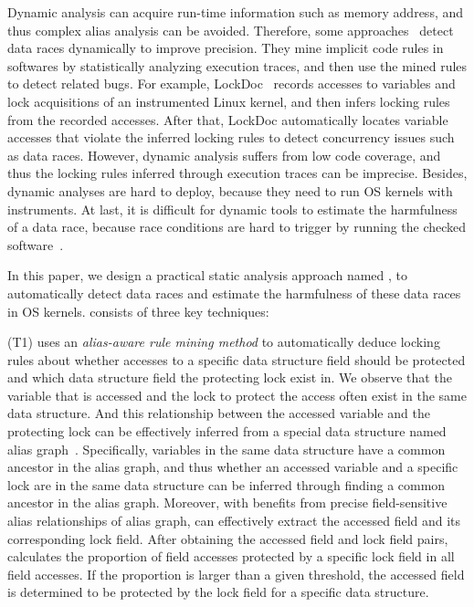 Dynamic analysis can acquire run-time information such as memory address, and 
thus complex alias analysis can be avoided. Therefore, some 
approaches~\cite{Lochmann:EuroSys19, Lu:SOSP07, Lu:FSE18, Joshi:ASE08, 
Liu:NSDI07} detect data races dynamically to improve precision. They mine 
implicit code rules in softwares by statistically analyzing execution traces, 
and then use the mined rules to detect related bugs. For example, 
LockDoc~\cite{Lochmann:EuroSys19} records accesses to variables and lock 
acquisitions of an instrumented Linux kernel, and then infers locking rules 
from the recorded accesses. After that, LockDoc automatically locates variable 
accesses that violate the inferred locking rules to detect concurrency issues 
such as data races. However, dynamic analysis suffers from low code coverage, 
and thus the locking rules inferred through execution traces can be imprecise. 
Besides, dynamic analyses are hard to deploy, because they need to run OS 
kernels with instruments. At last, it is difficult for dynamic tools to 
estimate the harmfulness of a data race, because race conditions are hard to 
trigger by running the checked software~\cite{Fonseca:DSN10, 
Burckhardt:ASPLOS10, Liu:FSE14, Zhou:EASE15}.

In this paper, we design a practical static analysis approach named \sys, 
to automatically detect data races and estimate the harmfulness of these data 
races in OS kernels. \sys consists of three key techniques:

(T1) \sys uses an {\em alias-aware rule mining method} to automatically deduce 
locking rules about whether accesses to a specific data structure field should 
be protected and which data structure field the protecting lock exist in. We 
observe that the variable that is accessed and the lock to protect the access 
often exist in the same data structure. And this relationship between the 
accessed variable and the protecting lock can be effectively inferred from a 
special data structure named alias graph~\cite{Li:ASPLOS22, Kastrinis:CC18}. 
Specifically, variables in the same data structure have a common ancestor in 
the alias graph, and thus whether an accessed variable and a specific lock are 
in the same data structure can be inferred through finding a common ancestor in 
the alias graph. Moreover, with benefits from precise field-sensitive alias 
relationships of alias graph, \sys can effectively extract the accessed field 
and its corresponding lock field. After obtaining the accessed field and lock 
field pairs, \sys calculates the proportion of field accesses protected by a 
specific lock field in all field accesses. If the proportion is larger than a 
given threshold, the accessed field is determined to be protected by the lock 
field for a specific data structure.

